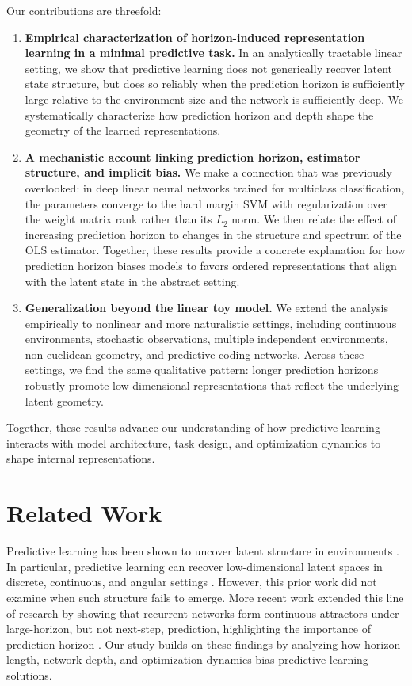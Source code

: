 \documentclass{article}
\begin{document}
Our contributions are threefold:  
\begin{enumerate}
\item \textbf{Empirical characterization of horizon-induced representation learning in a minimal predictive task.} In an analytically tractable linear setting, we show that predictive learning does not generically recover latent state structure, but does so reliably when the prediction horizon is sufficiently large relative to the environment size and the network is sufficiently deep. We systematically characterize how prediction horizon and depth shape the geometry of the learned representations.

\item \textbf{A mechanistic account linking prediction horizon, estimator structure, and implicit bias.} We make a connection that was previously overlooked: in deep linear neural networks trained for multiclass classification, the parameters converge to the hard margin SVM with regularization over the weight matrix rank rather than its $L_2$ norm. We then relate the effect of increasing prediction horizon to changes in the structure and spectrum of the OLS estimator. Together, these results provide a concrete explanation for how prediction horizon biases models to favors ordered representations that align with the latent state in the abstract setting.

\item \textbf{Generalization beyond the linear toy model.} We extend the analysis empirically to nonlinear and more naturalistic settings, including continuous environments, stochastic observations, multiple independent environments, non-euclidean geometry, and predictive coding networks. Across these settings, we find the same qualitative pattern: longer prediction horizons robustly promote low-dimensional representations that reflect the underlying latent geometry.

\end{enumerate}

Together, these results advance our understanding of how predictive learning interacts with model architecture, task design, and optimization dynamics to shape internal representations.  


\section{Related Work}

Predictive learning has been shown to uncover latent structure in environments \cite{recanatesi2021predictive}. In particular, predictive learning can recover low-dimensional latent spaces in discrete, continuous, and angular settings \cite{recanatesi2021predictive}. However, this prior work did not examine when such structure fails to emerge. More recent work extended this line of research by showing that recurrent networks form continuous attractors under large-horizon, but not next-step, prediction, highlighting the importance of prediction horizon \cite{levenstein2024sequential}. Our study builds on these findings by analyzing how horizon length, network depth, and optimization dynamics bias predictive learning solutions.
\end{document}
